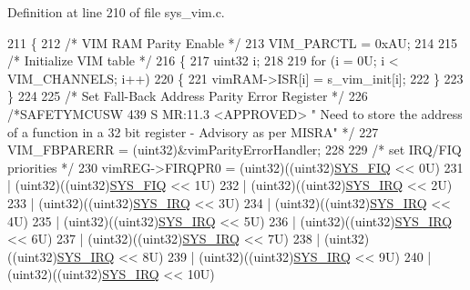 Definition at line 210 of file sys\+\_\+vim.\+c.


\begin{DoxyCode}
211 \{
212     \textcolor{comment}{/* VIM RAM Parity Enable */}
213     VIM\_PARCTL = 0xAU;
214     
215     \textcolor{comment}{/* Initialize VIM table */}
216     \{
217         uint32 i;
218 
219         \textcolor{keywordflow}{for} (i = 0U; i < VIM\_CHANNELS; i++)
220         \{
221             vimRAM->ISR[i] = s\_vim\_init[i];
222         \}
223     \}
224     
225     \textcolor{comment}{/* Set Fall-Back Address Parity Error Register */}
226     \textcolor{comment}{/*SAFETYMCUSW 439 S MR:11.3 <APPROVED> " Need to store the address of a function in a 32 bit register -
       Advisory as per MISRA" */}
227     VIM\_FBPARERR = (uint32)&vimParityErrorHandler;
228 
229     \textcolor{comment}{/* set IRQ/FIQ priorities */}
230     vimREG->FIRQPR0 = (uint32)((uint32)\mbox{\hyperlink{sys__vim_8h_a068bb33b993ffc9103931234af5aeff0ac624afef01cb666ec35237ccb410b614}{SYS\_FIQ}} << 0U)
231                     | (uint32)((uint32)\mbox{\hyperlink{sys__vim_8h_a068bb33b993ffc9103931234af5aeff0ac624afef01cb666ec35237ccb410b614}{SYS\_FIQ}} << 1U)
232                     | (uint32)((uint32)\mbox{\hyperlink{sys__vim_8h_a068bb33b993ffc9103931234af5aeff0a1c17474356eed74bfb34dc7abadf70a8}{SYS\_IRQ}} << 2U)
233                     | (uint32)((uint32)\mbox{\hyperlink{sys__vim_8h_a068bb33b993ffc9103931234af5aeff0a1c17474356eed74bfb34dc7abadf70a8}{SYS\_IRQ}} << 3U)
234                     | (uint32)((uint32)\mbox{\hyperlink{sys__vim_8h_a068bb33b993ffc9103931234af5aeff0a1c17474356eed74bfb34dc7abadf70a8}{SYS\_IRQ}} << 4U)
235                     | (uint32)((uint32)\mbox{\hyperlink{sys__vim_8h_a068bb33b993ffc9103931234af5aeff0a1c17474356eed74bfb34dc7abadf70a8}{SYS\_IRQ}} << 5U)
236                     | (uint32)((uint32)\mbox{\hyperlink{sys__vim_8h_a068bb33b993ffc9103931234af5aeff0a1c17474356eed74bfb34dc7abadf70a8}{SYS\_IRQ}} << 6U)
237                     | (uint32)((uint32)\mbox{\hyperlink{sys__vim_8h_a068bb33b993ffc9103931234af5aeff0a1c17474356eed74bfb34dc7abadf70a8}{SYS\_IRQ}} << 7U)
238                     | (uint32)((uint32)\mbox{\hyperlink{sys__vim_8h_a068bb33b993ffc9103931234af5aeff0a1c17474356eed74bfb34dc7abadf70a8}{SYS\_IRQ}} << 8U)
239                     | (uint32)((uint32)\mbox{\hyperlink{sys__vim_8h_a068bb33b993ffc9103931234af5aeff0a1c17474356eed74bfb34dc7abadf70a8}{SYS\_IRQ}} << 9U)
240                     | (uint32)((uint32)\mbox{\hyperlink{sys__vim_8h_a068bb33b993ffc9103931234af5aeff0a1c17474356eed74bfb34dc7abadf70a8}{SYS\_IRQ}} << 10U)

\end{DoxyCode}
